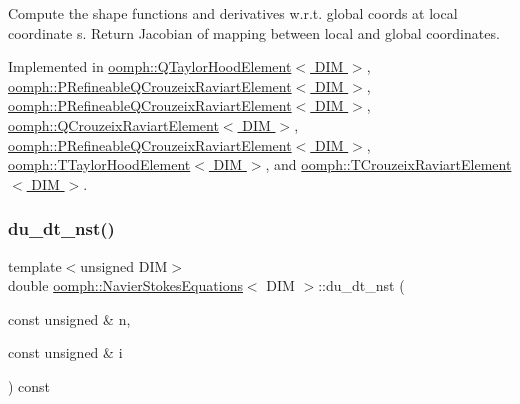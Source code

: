 Compute the shape functions and derivatives w.\+r.\+t. global coords at local coordinate s. Return Jacobian of mapping between local and global coordinates. 



Implemented in \hyperlink{classoomph_1_1QTaylorHoodElement_a50722aac3b81372e6eab8eda39680783}{oomph\+::\+Q\+Taylor\+Hood\+Element$<$ D\+I\+M $>$}, \hyperlink{classoomph_1_1PRefineableQCrouzeixRaviartElement_adb1580b8713df0efdda70ddf47afda20}{oomph\+::\+P\+Refineable\+Q\+Crouzeix\+Raviart\+Element$<$ D\+I\+M $>$}, \hyperlink{classoomph_1_1PRefineableQCrouzeixRaviartElement_a8ded9a5c48d5112468313b1354ad5b44}{oomph\+::\+P\+Refineable\+Q\+Crouzeix\+Raviart\+Element$<$ D\+I\+M $>$}, \hyperlink{classoomph_1_1QCrouzeixRaviartElement_af1553d79bb5f49fd21f695d468ea59d4}{oomph\+::\+Q\+Crouzeix\+Raviart\+Element$<$ D\+I\+M $>$}, \hyperlink{classoomph_1_1PRefineableQCrouzeixRaviartElement_a72a81749bb4c7f43462324935e1617a7}{oomph\+::\+P\+Refineable\+Q\+Crouzeix\+Raviart\+Element$<$ D\+I\+M $>$}, \hyperlink{classoomph_1_1TTaylorHoodElement_afada2580f5b4f0f94a91c383fe41ac5b}{oomph\+::\+T\+Taylor\+Hood\+Element$<$ D\+I\+M $>$}, and \hyperlink{classoomph_1_1TCrouzeixRaviartElement_a8211f7a3299d128f877722b00097754f}{oomph\+::\+T\+Crouzeix\+Raviart\+Element$<$ D\+I\+M $>$}.

\mbox{\label{classoomph_1_1NavierStokesEquations_ad8ffa0e111f4809e6544fbe4e477ed05}} 
\subsubsection{\texorpdfstring{du\+\_\+dt\+\_\+nst()}{du\_dt\_nst()}}
{\footnotesize\ttfamily template$<$unsigned D\+IM$>$ \\
double \hyperlink{classoomph_1_1NavierStokesEquations}{oomph\+::\+Navier\+Stokes\+Equations}$<$ D\+IM $>$\+::du\+\_\+dt\+\_\+nst (\begin{DoxyParamCaption}\item[{const unsigned \&}]{n,  }\item[{const unsigned \&}]{i }\end{DoxyParamCaption}) const\hspace{0.3cm}{\ttfamily [inline]}}



